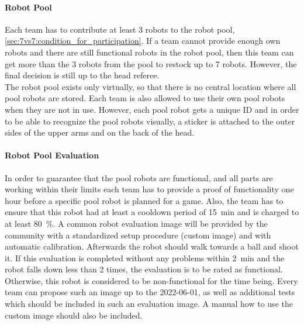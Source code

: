         \paragraph{Robot Pool}
            Each team has to contribute at least 3 robots to the robot pool, \cf \cref{sec:7vs7:condition_for_participation}. If a team cannot provide enough own robots and there are still functional robots in the robot pool, then this team can get more than the 3 robots from the pool to restock up to 7 robots. However, the final decision is still up to the head referee. \\
            The robot pool exists only virtually, so that there is no central location where all pool robots are stored. Each team is also allowed to use their own pool robots when they are not in use. However, each pool robot gets a unique ID and in order to be able to recognize the pool robots visually, a sticker is attached to the outer sides of the upper arms and on the back of the head.

        \paragraph{Robot Pool Evaluation}
            \label{sec:robot_pool_evaluation}
            In order to guarantee that the pool robots are functional, and all parts are working within their limits each team has to provide a proof of functionality one hour before a specific pool robot is planned for a game. Also, the team has to ensure that this robot had at least a cooldown period of \qty{15}{\minute} and is charged to at least \qty{80}{\percent}.
            A common robot evaluation image will be provided by the community with a standardized setup procedure (custom image) and with automatic calibration. Afterwards the robot should walk towards a ball and shoot it. If this evaluation is completed without any problems within \qty{2}{\minute} and the robot falls down less than 2 times, the evaluation is to be rated as functional. Otherwise, this robot is considered to be non-functional for the time being. Every team can propose such an image up to the 2022-06-01, as well as additional tests which should be included in such an evaluation image. A manual how to use the custom image should also be included.

